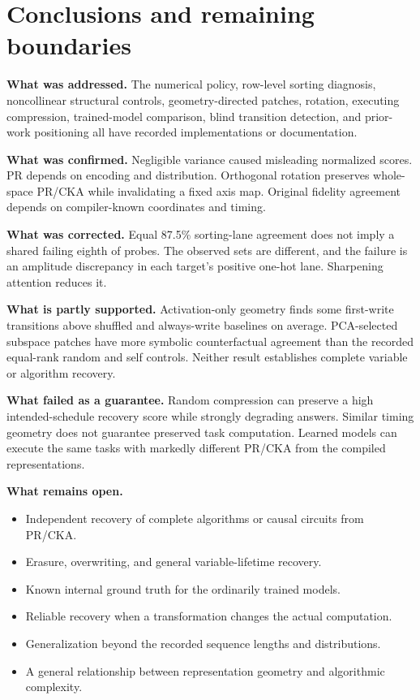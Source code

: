 \documentclass[10pt,a4paper]{article}
\newcommand{\newsection}[1]{\clearpage\section{#1}}
\begin{document}
\newsection{Conclusions and remaining boundaries}
\textbf{What was addressed.} The numerical policy, row-level sorting diagnosis, noncollinear structural controls, geometry-directed patches, rotation, executing compression, trained-model comparison, blind transition detection, and prior-work positioning all have recorded implementations or documentation.

\textbf{What was confirmed.} Negligible variance caused misleading normalized scores. PR depends on encoding and distribution. Orthogonal rotation preserves whole-space PR/CKA while invalidating a fixed axis map. Original fidelity agreement depends on compiler-known coordinates and timing.

\textbf{What was corrected.} Equal 87.5\% sorting-lane agreement does not imply a shared failing eighth of probes. The observed sets are different, and the failure is an amplitude discrepancy in each target's positive one-hot lane. Sharpening attention reduces it.

\textbf{What is partly supported.} Activation-only geometry finds some first-write transitions above shuffled and always-write baselines on average. PCA-selected subspace patches have more symbolic counterfactual agreement than the recorded equal-rank random and self controls. Neither result establishes complete variable or algorithm recovery.

\textbf{What failed as a guarantee.} Random compression can preserve a high intended-schedule recovery score while strongly degrading answers. Similar timing geometry does not guarantee preserved task computation. Learned models can execute the same tasks with markedly different PR/CKA from the compiled representations.

\textbf{What remains open.}
\begin{itemize}
\item Independent recovery of complete algorithms or causal circuits from PR/CKA.
\item Erasure, overwriting, and general variable-lifetime recovery.
\item Known internal ground truth for the ordinarily trained models.
\item Reliable recovery when a transformation changes the actual computation.
\item Generalization beyond the recorded sequence lengths and distributions.
\item A general relationship between representation geometry and algorithmic complexity.
\end{itemize}
\end{document}
